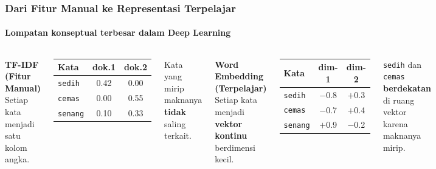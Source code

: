 \documentclass[t,aspectratio=169,xcolor=dvipsnames]{beamer}
\begin{document}
\begin{frame}
    \frametitle{Dari Fitur Manual ke Representasi Terpelajar}
    \framesubtitle{Lompatan konseptual terbesar dalam Deep Learning}
    \small
    \begin{columns}[T]
        \textbf{TF-IDF (Fitur Manual)}\\[0.3em]
        Setiap kata menjadi satu kolom angka.\\[0.3em]
        \begin{center}
        \begin{tabular}{lcc}
            \toprule
            Kata & dok.1 & dok.2 \\
            \midrule
            \texttt{sedih}  & 0.42 & 0.00 \\
            \texttt{cemas}  & 0.00 & 0.55 \\
            \texttt{senang} & 0.10 & 0.33 \\
            \bottomrule
        \end{tabular}
        \end{center}
        \footnotesize Kata yang mirip maknanya \textbf{tidak} saling terkait.

        \textbf{Word Embedding (Terpelajar)}\\[0.3em]
        Setiap kata menjadi \textbf{vektor kontinu} berdimensi kecil.\\[0.3em]
        \begin{center}
        \begin{tabular}{lcc}
            \toprule
            Kata & dim-1 & dim-2 \\
            \midrule
            \texttt{sedih}  & $-$0.8 & $+$0.3 \\
            \texttt{cemas}  & $-$0.7 & $+$0.4 \\
            \texttt{senang} & $+$0.9 & $-$0.2 \\
            \bottomrule
        \end{tabular}
        \end{center}
        \footnotesize \texttt{sedih} dan \texttt{cemas} \textbf{berdekatan} di ruang vektor karena maknanya mirip.
    \end{columns}
\end{frame}
\end{document}
